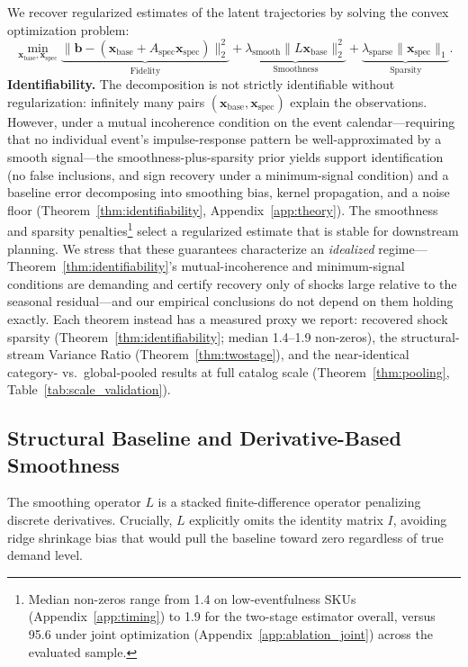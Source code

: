 \documentclass[10pt]{article} %
\theoremstyle{plain}
\theoremstyle{definition}
\newcommand{\xbase}{\mathbf{x}_{\text{base}}}
\newcommand{\xspec}{\mathbf{x}_{\text{spec}}}
\newcommand{\Aspec}{A_{\text{spec}}}
\newcommand{\bvec}{\mathbf{b}}
\begin{document}
We recover regularized estimates of the latent trajectories by solving the convex optimization problem:
{\small
\begin{equation}
\min_{\xbase, \xspec} \underbrace{\| \bvec - (\xbase + \Aspec \xspec) \|_{2}^{2}}_{\text{Fidelity}} + \underbrace{\lambda_{\text{smooth}} \| L \xbase \|_{2}^{2}}_{\text{Smoothness}} + \underbrace{\lambda_{\text{sparse}} \| \xspec \|_{1}}_{\text{Sparsity}}.
\label{eq:convex_decomp}
\end{equation}
}\textbf{Identifiability.} The decomposition is not strictly identifiable without regularization: infinitely many pairs $(\xbase, \xspec)$ explain the observations. However, under a mutual incoherence condition on the event calendar---requiring that no individual event's impulse-response pattern be well-approximated by a smooth signal---the smoothness-plus-sparsity prior yields support identification (no false inclusions, and sign recovery under a minimum-signal condition) and a baseline error decomposing into smoothing bias, kernel propagation, and a noise floor (Theorem~\ref{thm:identifiability}, Appendix~\ref{app:theory}). The smoothness and sparsity penalties\footnote{Median non-zeros range from 1.4 on low-eventfulness SKUs (Appendix~\ref{app:timing}) to 1.9 for the two-stage estimator overall, versus 95.6 under joint optimization (Appendix~\ref{app:ablation_joint}) across the evaluated sample.} select a regularized estimate that is stable for downstream planning. We stress that these guarantees characterize an \emph{idealized} regime---Theorem~\ref{thm:identifiability}'s mutual-incoherence and minimum-signal conditions are demanding and certify recovery only of shocks large relative to the seasonal residual---and our empirical conclusions do not depend on them holding exactly. Each theorem instead has a measured proxy we report: recovered shock sparsity (Theorem~\ref{thm:identifiability}; median 1.4--1.9 non-zeros), the structural-stream Variance Ratio (Theorem~\ref{thm:twostage}), and the near-identical category- vs.\ global-pooled results at full catalog scale (Theorem~\ref{thm:pooling}, Table~\ref{tab:scale_validation}).

\subsection{Structural Baseline and Derivative-Based Smoothness}

The smoothing operator $L$ is a stacked finite-difference operator penalizing discrete derivatives. Crucially, $L$ explicitly omits the identity matrix $I$, avoiding ridge shrinkage bias that would pull the baseline toward zero regardless of true demand level.
\end{document}
